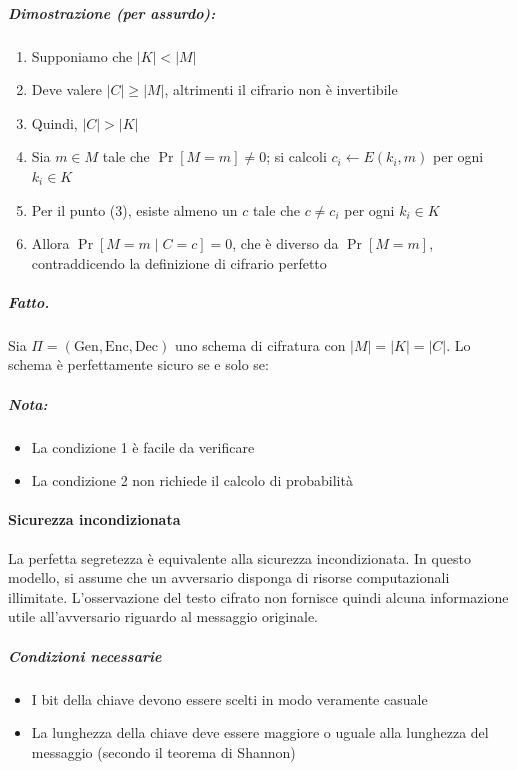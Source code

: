 \documentclass{article}
\begin{document}
\subparagraph{Dimostrazione (per assurdo):}
\begin{enumerate}
    \item Supponiamo che $|K| < |M|$
    \item Deve valere $|C| \geq |M|$, altrimenti il cifrario non è invertibile
    \item Quindi, $|C| > |K|$
    \item Sia $m \in M$ tale che $\Pr[M = m] \neq 0$; si calcoli $c_i \leftarrow E(k_i, m)$ per ogni $k_i \in K$
    \item Per il punto (3), esiste almeno un $c$ tale che $c \neq c_i$ per ogni $k_i \in K$
    \item Allora $\Pr[M = m \mid C = c] = 0$, che è diverso da $\Pr[M = m]$, contraddicendo la definizione di cifrario perfetto
\end{enumerate}

\subparagraph{Fatto.} Sia $\Pi = (\text{Gen}, \text{Enc}, \text{Dec})$ uno schema di cifratura con $|M| = |K| = |C|$. Lo schema è perfettamente sicuro se e solo se:

\subparagraph{Nota:}
\begin{itemize}
    \item La condizione 1 è facile da verificare
    \item La condizione 2 non richiede il calcolo di probabilità
\end{itemize}

\paragraph{Sicurezza incondizionata}
La perfetta segretezza è equivalente alla sicurezza incondizionata. In questo modello, si assume che un avversario disponga di risorse computazionali illimitate. L'osservazione del testo cifrato non fornisce quindi alcuna informazione utile all'avversario riguardo al messaggio originale.

\subparagraph{Condizioni necessarie}
\begin{itemize}
    \item I bit della chiave devono essere scelti in modo veramente casuale
    \item La lunghezza della chiave deve essere maggiore o uguale alla lunghezza del messaggio (secondo il teorema di Shannon)
\end{itemize}

            
 
       
        
    
\end{document}
